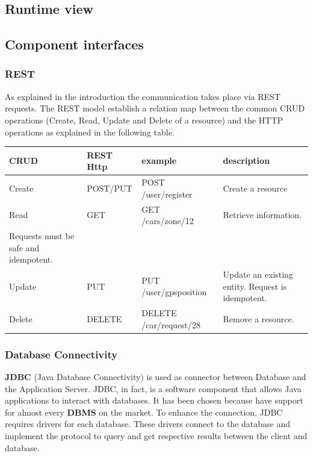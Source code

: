 \subsection{Runtime view}


\newpage

\subsection{Component interfaces} 
\subsubsection{REST}
As explained in the introduction the communication takes place via REST requests. The REST model establish a relation map between the common CRUD operations (Create, Read, Update and Delete of a resource) and the HTTP operations as explained in the following table.

\begin{center}
	\begin{adjustbox}{max width=\textwidth}	
		\begin{tabular}{|l|>{\raggedright}p{2.5cm}|>{\raggedright}p{4.5cm}|>{\raggedright}p{5cm}|}
			\hline 
			CRUD & REST Http & example &description\tabularnewline
			\hline 
			
			Create & POST/PUT & POST /user/register  & Create a resource \tabularnewline
			\hline 
			Read & GET & GET /cars/zone/12 & Retrieve information. \\  Requests must be safe and idempotent.\tabularnewline
			\hline 
			Update & PUT & PUT /user/gpsposition & Update an existing entity. Request is idempotent. \tabularnewline
			\hline 
			Delete & DELETE & DELETE /car/request/28 & Remove a resource.\tabularnewline
			\hline 
		\end{tabular}
	\end{adjustbox}	
	\par\end{center}

\subsubsection{Database Connectivity} \textbf{JDBC} (Java Database Connectivity) is used as connector between Database and the Application Server. JDBC, in fact, is a software component that allows Java applications to interact with databases. It has been chosen because have support for almost every \textbf{DBMS} on the market.
To enhance the connection, JDBC requires drivers for each database. These drivers connect to the database and implement the protocol to query and get respective results between the client and database. 


